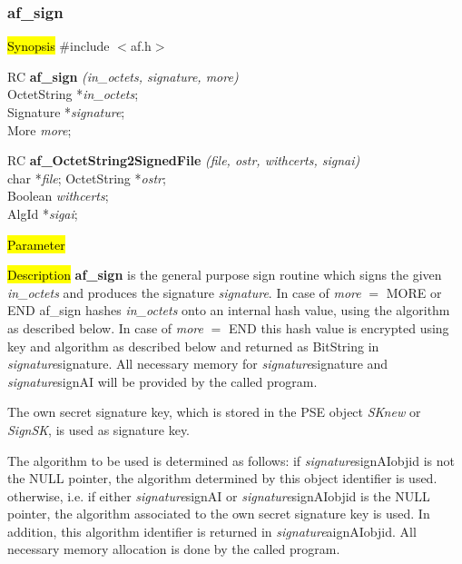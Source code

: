 \subsubsection{af\_sign}
\label{af_sign}
\hl{Synopsis}
\#include $<$af.h$>$

RC {\bf af\_sign} {\em (in\_octets, signature, more)} \\
OctetString *{\em in\_octets}; \\
Signature *{\em signature}; \\
More {\em more};

RC {\bf af\_OctetString2SignedFile} {\em (file, ostr, withcerts, signai)} \\
char *{\em file};
OctetString *{\em ostr}; \\
Boolean {\em withcerts}; \\
AlgId *{\em sigai};

\hl{Parameter}



\hl{Description}
{\bf af\_sign} is the general purpose sign routine which signs the given
{\em in\_octets} and produces the signature {\em signature}.
In case of {\em more} $=$ MORE or END af\_sign hashes {\em in\_octets} onto
an internal hash value, using the algorithm as described below.
In case of {\em more} $=$ END this hash value is encrypted using key and
algorithm as described below and returned as BitString in {\em signature}\pf signature.
All necessary memory for {\em signature}\pf signature and {\em signature}\pf signAI
will be provided by the called program.

The own secret signature key, which is stored in the PSE
object {\em SKnew} or {\em SignSK}, is used as signature key. 

The algorithm to be used is determined as follows:
\be
\m if {\em signature}\pf signAI\pf objid is not the NULL pointer, the algorithm
   determined by this object identifier is used.
\m otherwise, i.e. if either {\em signature}\pf signAI or {\em signature}\pf signAI\pf objid 
   is the NULL pointer, the algorithm
   associated to the own secret signature key is used.
   In addition, this algorithm identifier is returned in {\em signature}\pf aignAI\pf objid.
   All necessary memory allocation is done by the called program.
\ee

